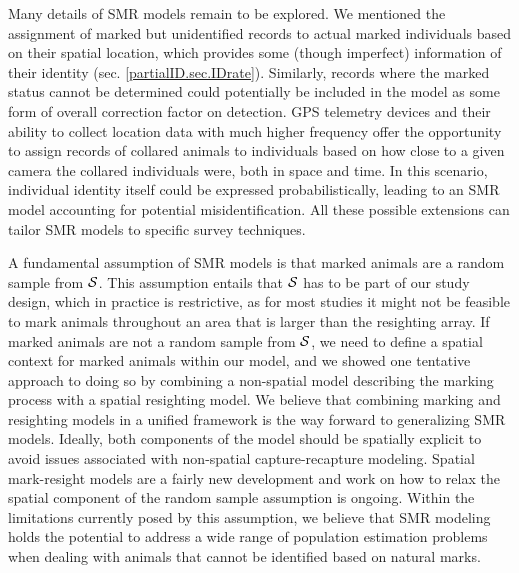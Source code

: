 Many details of SMR models remain to be explored. We mentioned the assignment of marked but unidentified records to actual marked individuals based on their spatial location, which provides some (though imperfect) information of their identity (sec. \ref{partialID.sec.IDrate}). Similarly, records where the marked status cannot be determined could potentially be included in the model as some form of overall correction factor on detection. GPS telemetry devices and their ability to collect location data with much higher frequency offer the opportunity to assign records of collared animals to individuals based on how close to a given camera the collared individuals were, both in space and time. In this scenario, individual identity itself could be expressed probabilistically, leading to an SMR model accounting for potential misidentification. All these possible extensions can tailor SMR models to specific survey techniques.

A fundamental assumption of SMR models is that marked animals are a random sample from ${\cal S}$. This assumption entails that ${\cal S}$ has to be part of our study design, which in practice is restrictive, as for most studies it might not be feasible to mark animals throughout an area that is larger than the resighting array. If marked animals are not a random sample from ${\cal S}$, we need to define a spatial context for marked animals within our model, and we showed one tentative approach to doing so by combining a non-spatial model describing the marking process with a spatial resighting model. We believe that combining marking and resighting models in a unified framework is the way forward to generalizing SMR models. Ideally, both components of the model should be spatially explicit to avoid issues associated with non-spatial capture-recapture modeling. Spatial mark-resight models are a fairly new development and work on how to relax the spatial component of the random sample assumption is ongoing. Within the limitations currently posed by this assumption, we believe that SMR modeling holds the potential to address a wide range of population estimation problems when dealing with animals that cannot be identified based on natural marks.




